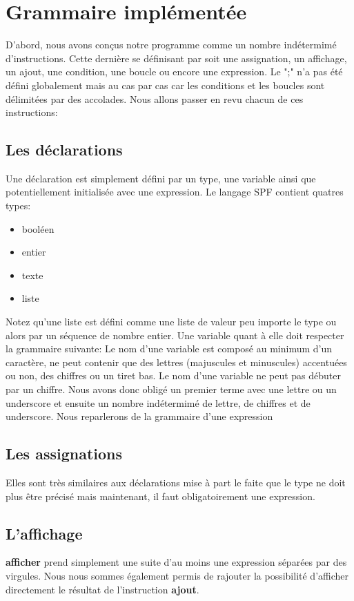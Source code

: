 \section{Grammaire implémentée}
D'abord, nous avons conçus notre programme comme un nombre indétermimé d'instructions.
Cette dernière se définisant par soit une assignation, un affichage, un ajout, une condition, une boucle ou encore une expression.
Le ";" n'a pas été défini globalement mais au cas par cas car les conditions et les boucles sont délimitées par des accolades.
Nous allons passer en revu chacun de ces instructions:

\subsection{Les déclarations}
Une déclaration est simplement défini par un type, une variable ainsi que potentiellement initialisée avec une expression.
Le langage SPF contient quatres types:

\begin{itemize}
\item booléen
\item entier
\item texte
\item liste
\end{itemize}

Notez qu'une liste est défini comme une liste de valeur peu importe le type ou alors par un séquence de nombre entier.
Une variable quant à elle doit respecter la grammaire suivante:
Le nom d’une variable est composé au minimum d’un caractère, ne peut contenir que des lettres (majuscules et minuscules) accentuées ou non, des chiffres ou un tiret bas. Le nom d’une variable ne peut pas débuter par un chiffre.
Nous avons donc obligé un premier terme avec une lettre ou un underscore et ensuite un nombre indétermimé de lettre, de chiffres et de underscore.
Nous reparlerons de la grammaire d'une expression

\subsection{Les assignations}
Elles sont très similaires aux déclarations mise à part le faite que le type ne doit plus être précisé mais maintenant, il faut obligatoirement une expression.

\subsection{L'affichage}
\textbf{afficher} prend simplement une suite d'au moins une expression séparées par des virgules.
Nous nous sommes également permis de rajouter la possibilité d'afficher directement le résultat de l'instruction \textbf{ajout}.

